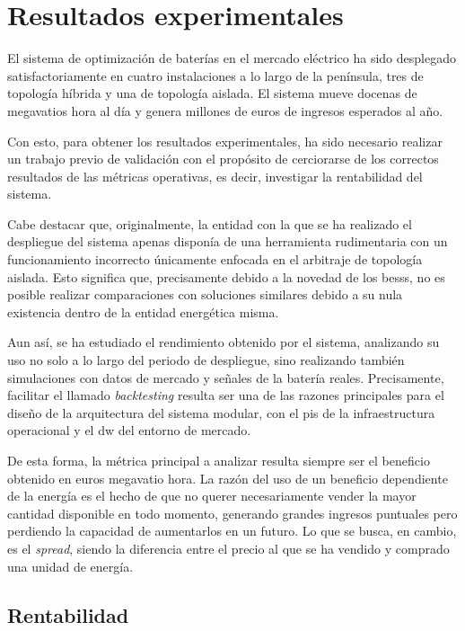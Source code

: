 
\cleardoublepage%

\chapter{Resultados experimentales}%
\label{makereference7}

El sistema de optimización de baterías en el mercado eléctrico ha sido desplegado satisfactoriamente en cuatro instalaciones a lo largo de la península, tres de topología híbrida y una de topología aislada. El sistema mueve docenas de megavatios hora al día y genera millones de euros de ingresos esperados al año.

Con esto, para obtener los resultados experimentales, ha sido necesario realizar un trabajo previo de validación con el propósito de cerciorarse de los correctos resultados de las métricas operativas, es decir, investigar la rentabilidad del sistema.

Cabe destacar que, originalmente, la entidad con la que se ha realizado el despliegue del sistema apenas disponía de una herramienta rudimentaria con un funcionamiento incorrecto únicamente enfocada en el arbitraje de topología aislada. Esto significa que, precisamente debido a la novedad de los \glspl{bess}, no es posible realizar comparaciones con soluciones similares debido a su nula existencia dentro de la entidad energética misma.

Aun así, se ha estudiado el rendimiento obtenido por el sistema, analizando su uso no solo a lo largo del periodo de despliegue, sino realizando también simulaciones con datos de mercado y señales de la batería reales. Precisamente, facilitar el llamado \textit{backtesting} resulta ser una de las razones principales para el diseño de la arquitectura del sistema modular, con el \gls{pis} de la infraestructura operacional y el \gls{dw} del entorno de mercado.

De esta forma, la métrica principal a analizar resulta siempre ser el beneficio obtenido en euros megavatio hora. La razón del uso de un beneficio dependiente de la energía es el hecho de que no querer necesariamente vender la mayor cantidad disponible en todo momento, generando grandes ingresos puntuales pero perdiendo la capacidad de aumentarlos en un futuro. Lo que se busca, en cambio, es el \textit{spread}, siendo la diferencia entre el precio al que se ha vendido y comprado una unidad de energía.

\section{Rentabilidad}%
\label{makereference7.1}

